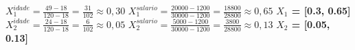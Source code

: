 \( X_1^{idade} = \frac{49 - 18}{120 - 18} = \frac{31}{102} \approx 0,30 \) 
\( X_1^{salario} = \frac{20000 - 1200}{30000 - 1200} = \frac{18800}{28800} \approx 0,65 \)
\textbf{\(X_1\) = [0.3, 0.65]}
\( X_2^{idade} = \frac{24 - 18}{120 - 18} = \frac{6}{102} \approx 0,05 \) 
\( X_2^{salario} = \frac{5000 - 1200}{30000 - 1200} = \frac{3800}{28800} \approx 0,13 \)
\textbf{\(X_2\) = [0.05, 0.13]}